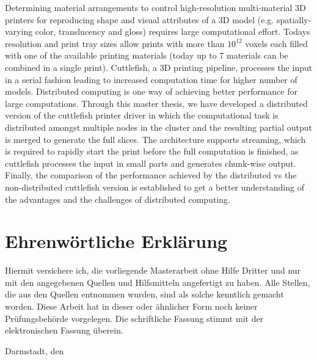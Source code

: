 \documentclass[type=msc,colorback,accentcolor=tud1d,bigchapter]{tudthesis}
\begin{document}
    {}
  \author{Suman Bidarahalli}
  \makethesistitle

\abstract
Determining material arrangements to control high-resolution multi-material 3D printers for reproducing shape and visual attributes of a 3D model (e.g. spatially-varying color, translucency and gloss) requires large computational effort. Today\textquotesingle s resolution and print tray sizes allow prints with more than \begin{math}10^{12}  \end{math} voxels each filled with one of the available printing materials (today up to 7 materials can be combined in a single print). Cuttlefish, a 3D printing pipeline, processes the input in a serial fashion leading to increased computation time for higher number of models. Distributed computing is one way of achieving better performance for large computations. Through this master thesis, we have developed a distributed version of the cuttlefish printer driver in which the computational task is distributed amongst multiple nodes in the cluster and the resulting partial output is merged to generate the full slices. The architecture supports streaming, which is required to rapidly start the print before the full computation is finished, as cuttlefish processes the input in small parts and generates chunk-wise output. Finally, the comparison of the performance achieved by the distributed vs the non-distributed cuttlefish version is established to get a better understanding of the advantages and the challenges of distributed computing.\newpage

\chapter*{Ehrenw\"ortliche Erkl\"arung}
Hiermit versichere ich, die vorliegende Masterarbeit ohne Hilfe Dritter und nur mit den angegebenen Quellen
und Hilfsmitteln angefertigt zu haben. Alle Stellen, die aus den Quellen entnommen wurden, sind als solche
kenntlich gemacht worden. Diese Arbeit hat in dieser oder \"ahnlicher Form noch keiner Pr\"ufungsbeh\"orde vorgelegen.
Die schriftliche Fassung stimmt mit der elektronischen Fassung \"uberein.

\vspace{1.5cm}
	
\noindent Darmstadt, den \date{\today}  \hspace{8.5cm} \author{Suman Bidarahalli}
\newpage
\end{document}
